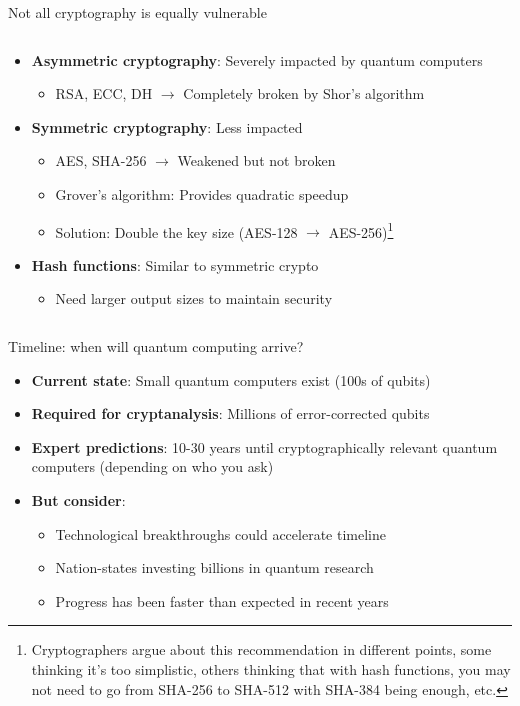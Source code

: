 \documentclass[aspectratio=169, lualatex, handout]{beamer}
\begin{document}
\begin{frame}{Not all cryptography is equally vulnerable}
	\begin{columns}[c]
		\begin{column}{1\textwidth}
			\begin{itemize}
				\item \textbf{Asymmetric cryptography}: Severely impacted by quantum computers
				      \begin{itemize}
					      \item RSA, ECC, DH $\rightarrow$ Completely broken by Shor's algorithm
				      \end{itemize}
				\item \textbf{Symmetric cryptography}: Less impacted
				      \begin{itemize}
					      \item AES, SHA-256 $\rightarrow$ Weakened but not broken
					      \item Grover's algorithm: Provides quadratic speedup
					      \item Solution: Double the key size (AES-128 $\rightarrow$ AES-256)\footnote{Cryptographers argue about this recommendation in different points, some thinking it's too simplistic, others thinking that with hash functions, you may not need to go from SHA-256 to SHA-512 with SHA-384 being enough, etc.}
				      \end{itemize}
				\item \textbf{Hash functions}: Similar to symmetric crypto
				      \begin{itemize}
					      \item Need larger output sizes to maintain security
				      \end{itemize}
			\end{itemize}
		\end{column}
	\end{columns}
\end{frame}

\begin{frame}{Timeline: when will quantum computing arrive?}
	\begin{itemize}
		\item \textbf{Current state}: Small quantum computers exist (100s of qubits)
		\item \textbf{Required for cryptanalysis}: Millions of error-corrected qubits
		\item \textbf{Expert predictions}: 10-30 years until cryptographically relevant quantum computers (depending on who you ask)
		\item \textbf{But consider}:
		      \begin{itemize}
			      \item Technological breakthroughs could accelerate timeline
			      \item Nation-states investing billions in quantum research
			      \item Progress has been faster than expected in recent years
		      \end{itemize}
	\end{itemize}
\end{frame}
\end{document}
